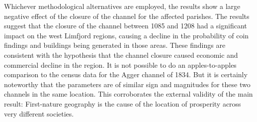 \documentclass[11pt]{article}
\begin{document}
Whichever methodological alternatives are employed, the results show a large negative effect of the closure of the channel for the affected parishes. The results suggest that the closure of the channel between 1085 and 1208 had a significant impact on the west Limfjord regions, causing a decline in the probability of coin findings and buildings being generated in those areas. These findings are consistent with the hypothesis that the channel closure caused economic and commercial decline in the region. It is not possible to do an apples-to-apples comparison to the census data for the Agger channel of 1834. But it is certainly noteworthy that the parameters are of similar sign and magnitudes for these two channels in the same location. This corroborates the external validity of the main result: First-nature geography is the cause of the location of prosperity across very different societies. 
\end{document}
